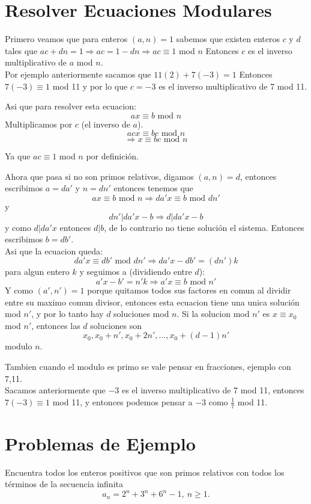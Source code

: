 \documentclass[11pt]{scrartcl}
\begin{document}
\section{Resolver Ecuaciones Modulares}

Primero veamos que para enteros $(a,n)=1$ sabemos que existen enteros $c$ y $d$ tales que $ac+dn=1 \Rightarrow ac=1-dn \Rightarrow ac\equiv 1$ mod $n$ 
Entonces $c$ es el inverso multiplicativo de $a$ mod $n$.\\

Por ejemplo anteriormente sacamos que $11(2)+7(-3)=1$ Entonces $7(-3)\equiv 1$ mod 11 y por lo que $c=-3$ es el inverso multiplicativo de 7 mod 11.

Asi que para resolver esta ecuacion: 
$$ax\equiv b \text{ mod } n$$
Multiplicamos por $c$ (el inverso de $a$).
$$acx \equiv bc \text{ mod } n$$
$$\Rightarrow x \equiv bc \text{ mod } n$$

Ya que $ac\equiv 1$ mod $n$ por definición.

Ahora que pasa si no son primos relativos, digamos $(a,n)=d$, entonces escribimos $a=da'$ y $n=dn'$ entonces tenemos que 
$$ax\equiv b \text{ mod }n \Rightarrow da'x \equiv b \text { mod } dn'$$
y 
$$dn' | da'x -b \Rightarrow d|da'x-b$$
 y como $d| da'x$ entonces $d|b$, de lo contrario no tiene solución el sistema. Entonces escribimos $b=db'$. \\
 Asi que la ecuacion queda:
$$ da'x \equiv db' \text{ mod } dn' \Rightarrow da'x-db'=(dn')k$$
para algun entero $k$ y seguimos a (dividiendo entre $d$):
$$a'x-b'=n'k \Rightarrow a'x\equiv b \text{ mod } n'$$
Y como $(a',n')=1$ porque quitamos todos sus factores en comun al dividir entre su maximo comun divisor, entonces esta ecuacion tiene una unica solución mod $n'$, y por lo tanto hay $d$ soluciones mod $n$.
Si la solucion mod $n'$ es $x\equiv x_0$ mod $n'$, entonces las $d$ soluciones son 
$$x_0, x_0+n', x_0+2n', \ldots , x_0+(d-1)n'$$
modulo $n$.

Tambien cuando el modulo es primo se vale pensar en fracciones, ejemplo con 7,11. \\
Sacamos anteriormente que $-3$ es el inverso multiplicativo de 7 mod 11, entonces $7(-3)\equiv 1$ mod 11, y entonces podemos pensar a $-3$ como $\frac{1}{7}$ mod 11.

\section{Problemas de Ejemplo}

\begin{example} [IMO 2005/4]
    Encuentra todos los enteros positivos que son primos relativos con todos los términos de la secuencia infinita $$ a_n=2^n+3^n+6^n -1,\ n\geq 1. $$
\end{example}
\end{document}
